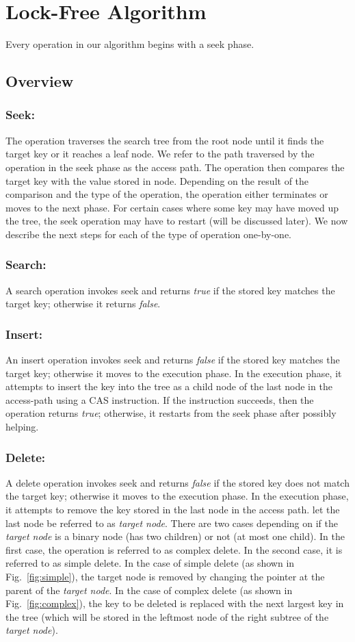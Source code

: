 \section{Lock-Free Algorithm}
Every operation in our algorithm begins with a seek phase. 
\subsection{Overview}
\subsubsection{Seek:} The operation traverses the search tree from the root node until it finds the target key or it reaches a leaf node. We refer to the path traversed by the operation in the seek phase as the access path. The operation then compares the target key with the value stored in node. Depending on the result of the comparison and the type of the operation, the operation either terminates or moves to the next phase. For certain cases where some key may have moved up the tree, the seek operation may have to restart (will be discussed later). We now describe the next steps for each of the type of operation one-by-one.
\subsubsection{Search:} A search operation invokes seek and returns \textit{true} if the stored key matches the target key; otherwise it returns \textit{false}.
\subsubsection{Insert:} An insert operation invokes seek and returns \textit{false} if the stored key matches the target key; otherwise it moves to the execution phase. In the execution phase, it attempts to insert the key into the tree as a child node of the last node in the access-path using a CAS instruction. If the instruction succeeds, then the operation returns \textit{true}; otherwise, it restarts from the seek phase after possibly helping.
\subsubsection{Delete:} A delete operation invokes seek and returns \textit{false} if the stored key does not match the target key; otherwise it moves to the execution phase. In the execution phase, it attempts to remove the key stored in the last node in the access path. let the last node be referred to as \textit{target node}. There are two cases depending on if the \textit{target node} is a binary node (has two children) or not (at most one child). In the first case, the operation is referred to as complex delete. In the second case, it is referred to as simple delete. In the case of simple delete (as shown in Fig.~\ref{fig:simple}), the target node is removed by changing the pointer at the parent of the \textit{target node}. In the case of complex delete (as shown in Fig.~\ref{fig:complex}), the key to be deleted is replaced with the next largest key in the tree (which will be stored in the leftmost node of the right subtree of the \textit{target node}). 


